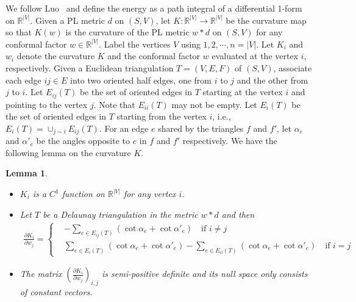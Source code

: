 \documentclass[11pt]{article}
\newtheorem{lemma}[theorem]{Lemma}
\begin{document}
We follow Luo~\cite{luo} and define the energy as a path integral of a differential 1-form on $\mathbb{R}^{|V|}$. 
Given a PL metric $d$ on $(S, V)$, let $K: \mathbb{R}^{|V|} \rightarrow \mathbb{R}^{|V|}$ be the curvature map
so that $K(w)$ is the curvature of the PL metric $w*d$ on $(S, V)$ for any conformal factor $w\in \mathbb{R}^{|V|}$. 
Label the vertices $V$ using $1, 2, \cdots, n=|V|$. 
Let $K_i$ and $w_i$ denote the curvature $K$ and the conformal factor $w$ evaluated at the vertex $i$, respectively.
Given a Euclidean triangulation $T=(V, E, F)$ of $(S, V)$, associate each edge $ij \in E$ into two oriented 
half edges, one from $i$ to $j$ and the other from $j$ to $i$. 
Let $E_{ij}(T)$ be the set of oriented edges in $T$ starting 
at the vertex $i$ and pointing to the vertex $j$. Note that $E_{ii}(T)$ may not be empty. 
Let $E_i(T)$ be the set of oriented edges in $T$ starting from the vertex $i$, i.e.,  
$E_i(T) = \cup _{j \sim i} E_{ij}(T)$. 
For an edge $e$ shared by the triangles $f$ and $f'$, let $\alpha_e$ and $\alpha'_e$ be the angles opposite 
to $e$ in $f$ and $f'$ respectively. We have the following lemma on the curvature $K$.  
\begin{lemma}
\begin{itemize}
\item[(i)] $K_i$ is a $C^1$ function on $\mathbb{R}^{|V|}$ for any vertex $i$. 
\item[(ii)] Let $T$ be a Delaunay triangulation in the metric $w*d$ and then 
\begin{eqnarray}
\frac{\partial K_i}{\partial w_j} = \left\{
\begin{array}{rl}
& -\sum_{e\in E_{ij}(T)}(\cot\alpha_e + \cot \alpha'_e)  \text{~~~if $i\neq j$}\\
& \sum_{e\in E_i(T)} (\cot\alpha_e + \cot \alpha'_e) - \sum_{e\in E_{ii}(T)} (\cot\alpha_e + \cot \alpha'_e)  \text{~~~if  $i = j$ }
\end{array} \right.
\label{eqn:pKpw}
\end{eqnarray}
\item[(iii)] The matrix $(\frac{\partial K_i}{\partial w_j})_{i, j}$ is semi-positive definite and its null space
 only consists of constant vectors. 
\end{itemize}
\label{lem:pKpw}
\end{lemma}
\end{document}
